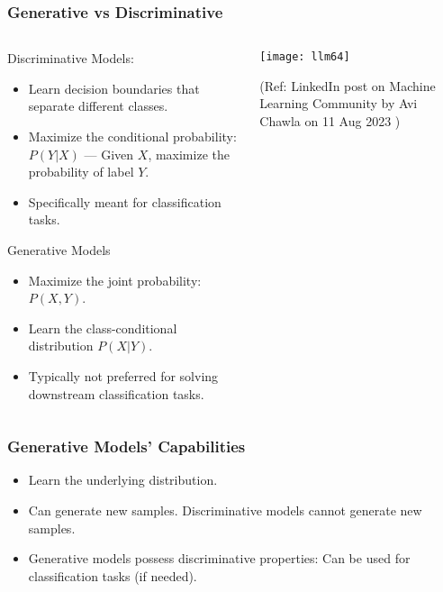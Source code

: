 \begin{frame}[fragile]\frametitle{Generative vs Discriminative}
\begin{columns}
    \begin{column}[T]{0.6\linewidth}
Discriminative Models:
\begin{itemize}
    \item Learn decision boundaries that separate different classes.
    \item Maximize the conditional probability: $P(Y|X)$ — Given $X$, maximize the probability of label $Y$.
    \item Specifically meant for classification tasks.
\end{itemize}

Generative Models
\begin{itemize}
    \item Maximize the joint probability: $P(X, Y)$.
    \item Learn the class-conditional distribution $P(X|Y)$.
    \item Typically not preferred for solving downstream classification tasks.
\end{itemize}
    \end{column}
    \begin{column}[T]{0.4\linewidth}
		\begin{center}
		\texttt{[image: llm64]}
		\end{center}
		
		{\tiny (Ref: LinkedIn post on Machine Learning Community by Avi Chawla on 11 Aug 2023 )}
    \end{column}
  \end{columns}
\end{frame}

\begin{frame}[fragile]\frametitle{Generative Models' Capabilities}

\begin{itemize}
    \item Learn the underlying distribution.
    \item Can generate new samples. Discriminative models cannot generate new samples.
	\item Generative models possess discriminative properties: Can be used for classification tasks (if needed).
\end{itemize}

\end{frame}

